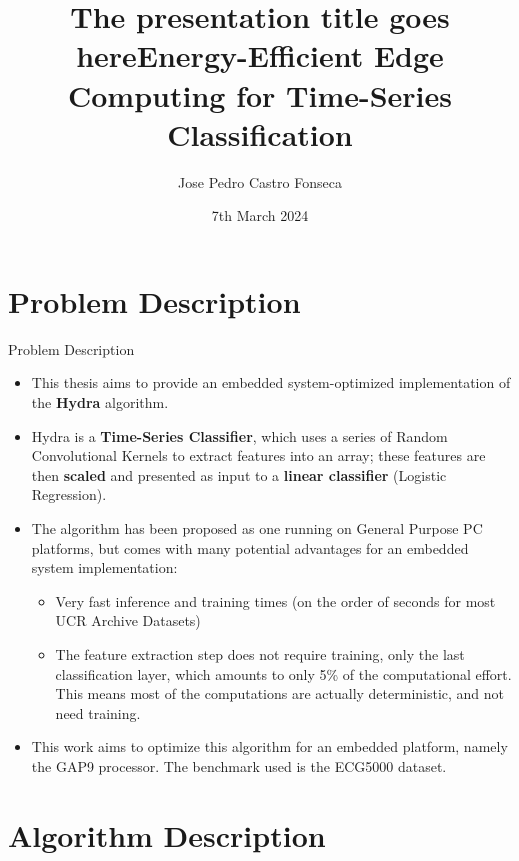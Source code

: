 \documentclass[10pt,aspectratio=169]{beamer}
\title{The presentation title goes here}
\begin{document}
\def\titlefigure{elements/title-page-image-alt}
\title{Energy-Efficient Edge Computing for Time-Series Classification}
\date[07/03/2024]{7th March 2024}
\author{Jose Pedro Castro Fonseca}
\titleframe

\tocframe

\section{Problem Description}
\begin{frame}[fragile]{Problem Description}

	\begin{itemize}
		\item This thesis aims to provide an embedded system-optimized implementation of the \textbf{Hydra} algorithm.
		\item Hydra is a \textbf{Time-Series Classifier}, which uses a series of Random Convolutional Kernels to extract features into an array; 
			  these features are then \textbf{scaled} and presented as input to a \textbf{linear classifier} (Logistic Regression).

		\item  The algorithm has been proposed as one running on General Purpose PC platforms, but comes with many potential advantages for an embedded system implementation:
		\begin{itemize}
			\item Very fast inference and training times (on the order of seconds for most UCR Archive Datasets)
			\item The feature extraction step does not require training, only the last classification layer, which amounts to only 5\% of the computational effort. This means most of the computations are actually deterministic, and not need training.
		\end{itemize}
	
		\item This work aims to optimize this algorithm for an embedded platform, namely the GAP9 processor. The benchmark used is the ECG5000 dataset.
	\end{itemize}
\end{frame}

\section{Algorithm Description}
\end{document}
